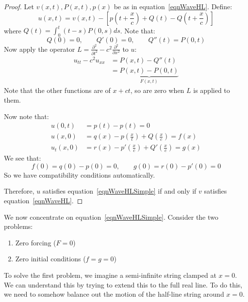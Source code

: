 \documentclass[../Main.tex]{subfiles}
\begin{document}
\begin{proof}
    Let $v(x, t), P(x, t), p(x)$ be as in equation~\ref{eqnWaveHL}. Define:
    \begin{equation*}
        u(x, t) = v(x, t) - \left[p\left(t + \frac{x}{c}\right) + Q(t) - Q\left(t + \frac{x}{c}\right)\right]
    \end{equation*}
    where $Q(t) = \int_{0}^{t} (t - s) P(0, s) ds$.
    Note that:
    \begin{equation*}
        Q(0) = 0,\qquad Q'(0) = 0,\qquad Q''(t) = P(0,t)
    \end{equation*}
    Now apply the operator $L = \frac{\partial^{2}}{\partial t^{2}} - c^2 \frac{\partial^{2}}{\partial x^{2}}$ to $u$:
    \begin{align*}
        u_{tt} - c^2 u_{xx} &= P(x, t) - Q''(t) \\
        &= \underbrace{P(x, t) - P(0, t)}_{F(x, t)}
    \end{align*}
    Note that the other functions are of $x + ct$, so are zero when $L$ is applied to them.

    Now note that:
    \begin{align*}
        u(0, t) &= p(t) - p(t) = 0 \\
        u(x, 0) &= q(x) - p\left(\frac{x}{t}\right) + Q\left(\frac{x}{c}\right) = f(x) \\
        u_t(x, 0) &= r(x) - p'\left(\frac{x}{c}\right) + Q'\left(\frac{x}{c}\right) = g(x)
    \end{align*}
    We see that:
    \begin{equation*}
        f(0) = q(0) - p(0) = 0, \qquad g(0) = r(0) - p'(0) = 0
    \end{equation*}
    So we have compatibility conditions automatically.

    Therefore, $u$ satisfies equation~\ref{eqnWaveHLSimple} if and only if $v$ satisfies equation~\ref{eqnWaveHL}.
\end{proof}
We now concentrate on equation~\ref{eqnWaveHLSimple}. Consider the two problems:
\begin{enumerate}
    \item Zero forcing ($F = 0$)
    \item Zero initial conditions ($f = g = 0$)
\end{enumerate}
To solve the first problem, we imagine a semi-infinite string clamped at $x = 0$. We can understand this by trying to extend this to the full real line. To do this, we need to somehow balance out the motion of the half-line string around $x = 0$.
\end{document}
